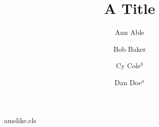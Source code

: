 \begin{filecontents*}[overwrite]{amslike.cls}
\let\addresses\@empty
\renewcommand{\author}[2][]{\g@addto@macro\addresses{\@xauthor{#2}}\gdef\@author{#2}}
\newcommand{\address}[2][]{\g@addto@macro\addresses{\@xaddress{#1}{#2}}}
\newcommand{\email}[2][]{\g@addto@macro\addresses{\@xemail{#1}{#2}}}
\def\@xauthor#1{\par\noindent #1\par}
\def\@xaddress#1#2{\par\noindent\ifx\relax#1\relax\else(#1) \fi#2\par}
\def\@xemail#1#2{\par\noindent E-mail: #2\par}
\AtEndDocument{\addresses}
\end{filecontents*}
\documentclass{amslike}

\title{A Title}
\author{Ann Able}
\address{Univ A, Town}
\address[Current address]{Lab C, Place}
\author{Bob Baker}
\address[]{Univ B, City}
\author{Cy Cole$^{b}$}
\author{Dan Doe$^{a}$}
\address[b]{Lab D, Place}
\address[a]{Lab E, Place}
\maketitle
\section{Intro}
Body.


